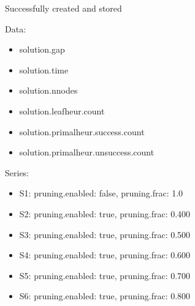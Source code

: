 \documentclass[landscape, 12pt]{report}
\begin{document}
Successfully created and stored

Data:
\begin{itemize}
\item solution.gap
\item solution.time
\item solution.nnodes
\item solution.leafheur.count
\item solution.primalheur.success.count
\item solution.primalheur.unsuccess.count
\end{itemize}
Series:
\begin{itemize}
\item S1: pruning.enabled: false, pruning.frac: 1.0
\item S2: pruning.enabled: true, pruning.frac: 0.400
\item S3: pruning.enabled: true, pruning.frac: 0.500
\item S4: pruning.enabled: true, pruning.frac: 0.600
\item S5: pruning.enabled: true, pruning.frac: 0.700
\item S6: pruning.enabled: true, pruning.frac: 0.800
\end{itemize}
\end{document}
